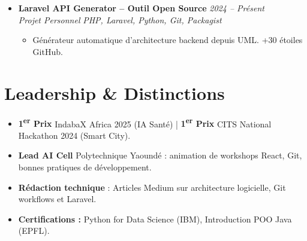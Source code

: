 \documentclass[a4paper,11pt]{article}
\begin{document}
\begin{itemize}[leftmargin=*, label={-}]
\item \textbf{Laravel API Generator -- Outil Open Source} \hfill \textit{2024 -- Présent} \\
\textit{Projet Personnel} \hfill \textit{PHP, Laravel, Python, Git, Packagist}
\vspace{-2pt}
    \begin{itemize}[leftmargin=0.4cm, nosep, label=\tiny$\bullet$]
        \item \small{Générateur automatique d'architecture backend depuis UML. +30 étoiles GitHub.}
    \end{itemize}
\vspace{3pt}

\end{itemize}

\section{Leadership \& Distinctions}
\begin{itemize}[leftmargin=*, label=\tiny$\bullet$, nosep]
    \item \small{\textbf{1\textsuperscript{er} Prix} IndabaX Africa 2025 (IA Santé) | \textbf{1\textsuperscript{er} Prix} CITS National Hackathon 2024 (Smart City).}
    \item \small{\textbf{Lead AI Cell} Polytechnique Yaoundé : animation de workshops React, Git, bonnes pratiques de développement.}
    \item \small{\textbf{Rédaction technique} : Articles Medium sur architecture logicielle, Git workflows et Laravel.}
    \item \small{\textbf{Certifications :} Python for Data Science (IBM), Introduction POO Java (EPFL).}
\end{itemize}
\end{document}
